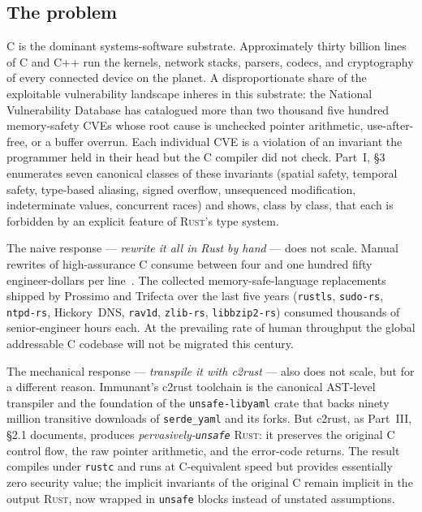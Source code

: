 \documentclass[12pt]{article}
\theoremstyle{definition}
\theoremstyle{remark}
\newcommand{\rust}{\textnormal{\textsc{Rust}}}
\newcommand{\unsafelibyaml}{\texttt{unsafe-libyaml}}
\begin{document}
\subsection{The problem}
\label{sec:problem}

C is the dominant systems-software substrate. Approximately thirty
billion lines of C and C++ run the kernels, network stacks, parsers,
codecs, and cryptography of every connected device on the planet. A
disproportionate share of the exploitable vulnerability landscape
inheres in this substrate: the National Vulnerability Database has
catalogued more than two thousand five hundred memory-safety CVEs whose
root cause is unchecked pointer arithmetic, use-after-free, or a buffer
overrun. Each individual CVE is a violation of an invariant the
programmer held in their head but the C compiler did not check.
Part~I, \S{}3 enumerates seven canonical classes of these invariants
(spatial safety, temporal safety, type-based aliasing, signed overflow,
unsequenced modification, indeterminate values, concurrent races) and
shows, class by class, that each is forbidden by an explicit feature of
\rust{}'s type system.

The naive response --- \emph{rewrite it all in Rust by hand} --- does
not scale. Manual rewrites of high-assurance C consume between four and
one hundred fifty engineer-dollars per line~\cite{economics2026}. The
collected memory-safe-language replacements shipped by Prossimo and
Trifecta over the last five years (\texttt{rustls}, \texttt{sudo-rs},
\texttt{ntpd-rs}, Hickory~DNS, \texttt{rav1d}, \texttt{zlib-rs},
\texttt{libbzip2-rs}) consumed thousands of senior-engineer hours each.
At the prevailing rate of human throughput the global addressable C
codebase will not be migrated this century.

The mechanical response --- \emph{transpile it with c2rust} --- also
does not scale, but for a different reason. Immunant's c2rust toolchain
is the canonical AST-level transpiler and the foundation of the
\unsafelibyaml{} crate that backs ninety million transitive downloads of
\texttt{serde\_yaml} and its forks. But c2rust, as Part~III, \S{}2.1
documents, produces \emph{pervasively-\texttt{unsafe}} \rust{}: it
preserves the original C control flow, the raw pointer arithmetic, and
the error-code returns. The result compiles under \texttt{rustc} and
runs at C-equivalent speed but provides essentially zero security value;
the implicit invariants of the original C remain implicit in the output
\rust{}, now wrapped in \texttt{unsafe} blocks instead of unstated
assumptions.
\end{document}
